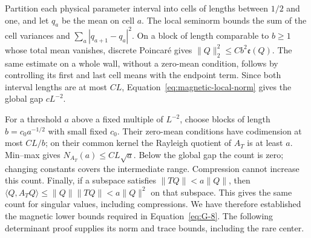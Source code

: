 Partition each physical parameter interval into cells of lengths between
$1/2$ and one, and let $q_a$ be the mean on cell $a$. The local
seminorm bounds the sum of the cell variances and
$\sum_a|q_{a+1}-q_a|^2$. On a block of length comparable to $b\ge1$
whose total mean vanishes, discrete Poincar\'e gives
$\|Q\|_2^2\le Cb^2\mathfrak e(Q)$. The same estimate on a whole
wall, without a zero-mean condition, follows by controlling its first
and last cell means with the endpoint term. Since both interval
lengths are at most $CL$, Equation~\eqref{eq:magnetic-local-norm}
gives the global gap $cL^{-2}$.

For a threshold $a$ above a fixed multiple of $L^{-2}$, choose blocks
of length $b=c_0a^{-1/2}$ with small fixed $c_0$. Their zero-mean
conditions have codimension at most $CL/b$; on their common kernel
the Rayleigh quotient of $A_T$ is at least $a$. Min--max gives
$N_{A_T}(a)\le CL\sqrt a$. Below the global gap the count is zero;
changing constants covers the intermediate range. Compression cannot
increase this count. Finally, if a subspace satisfies
$\|TQ\|<a\|Q\|$, then
$\langle Q,A_TQ\rangle\le\|Q\|\|TQ\|<a\|Q\|^2$ on that
subspace. This gives the same count for singular values, including
compressions. We have therefore established the magnetic lower bounds
required in Equation~\eqref{eq:G-8}. The following determinant proof
supplies its norm and trace bounds, including the rare center.

